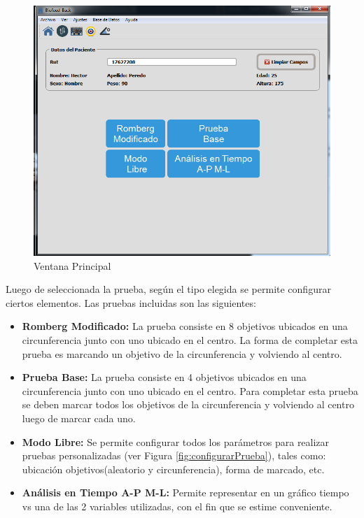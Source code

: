 \documentclass[12pt,a4paper]{article}
\begin{document}
\begin{figure}[H]
	\centering
	\includegraphics[scale=0.6]{images/mainwindow}
	\caption{Ventana Principal}
	\label{fig:mainwindow}
\end{figure}

Luego de seleccionada la prueba, según el tipo elegida se permite configurar ciertos elementos.
Las pruebas incluidas son las siguientes:
\begin{itemize}
	\item \textbf{Romberg Modificado:} La prueba consiste en 8 objetivos ubicados en una circunferencia junto con uno ubicado en el centro.
	La forma de completar esta prueba es marcando un objetivo de la circunferencia y volviendo al centro.
	\item \textbf{Prueba Base:} La prueba consiste en 4 objetivos ubicados en una circunferencia junto con uno ubicado en el centro.
	Para completar esta prueba se deben marcar todos los objetivos de la circunferencia y volviendo al centro luego de marcar cada uno.
	\item \textbf{Modo Libre:} Se permite configurar todos los parámetros para realizar pruebas personalizadas (ver Figura \ref{fig:configurarPrueba}), tales como: ubicación objetivos(aleatorio y circunferencia), forma de marcado, etc.
	\item \textbf{Análisis en Tiempo A-P M-L:} Permite representar en un gráfico tiempo vs una de las 2 variables utilizadas, con el fin que se estime conveniente.
\end{itemize}
\end{document}
